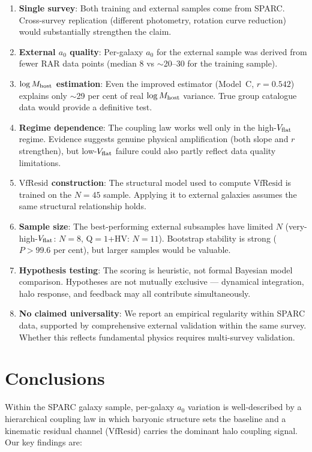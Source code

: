 \documentclass[fleqn,usenatbib]{mnras}
\newcommand{\azero}{a_0}
\newcommand{\vflat}{V_{\rm flat}}
\newcommand{\vfresid}{\mathrm{VfResid}}
\newcommand{\mhost}{M_{\rm host}}
\begin{document}
\begin{enumerate}
\item \textbf{Single survey}: Both training and external samples come from
  SPARC. Cross-survey replication (different photometry, rotation curve
  reduction) would substantially strengthen the claim.
\item \textbf{External $\azero$ quality}: Per-galaxy $\azero$ for the
  external sample was derived from fewer RAR data points (median 8 vs
  $\sim$20--30 for the training sample).
\item \textbf{$\log \mhost$ estimation}: Even the improved estimator
  (Model~C, $r = 0.542$) explains only $\sim$29 per cent of real
  $\log \mhost$ variance. True group catalogue data would provide a
  definitive test.
\item \textbf{Regime dependence}: The coupling law works well only in the
  high-$\vflat$ regime. Evidence suggests genuine physical amplification
  (both slope and $r$ strengthen), but low-$\vflat$ failure could also
  partly reflect data quality limitations.
\item \textbf{$\vfresid$ construction}: The structural model used to
  compute $\vfresid$ is trained on the $N = 45$ sample. Applying it to
  external galaxies assumes the same structural relationship holds.
\item \textbf{Sample size}: The best-performing external subsamples have
  limited $N$ (very-high-$\vflat$: $N = 8$, Q$=1$+HV: $N = 11$).
  Bootstrap stability is strong ($P > 99.6$ per cent), but larger samples
  would be valuable.
\item \textbf{Hypothesis testing}: The scoring is heuristic, not formal
  Bayesian model comparison. Hypotheses are not mutually exclusive ---
  dynamical integration, halo response, and feedback may all contribute
  simultaneously.
\item \textbf{No claimed universality}: We report an empirical regularity
  within SPARC data, supported by comprehensive external validation within
  the same survey. Whether this reflects fundamental physics requires
  multi-survey validation.
\end{enumerate}

\section{Conclusions}
\label{sec:conclusions}

Within the SPARC galaxy sample, per-galaxy $\azero$ variation is
well-described by a hierarchical coupling law in which baryonic structure
sets the baseline and a kinematic residual channel ($\vfresid$) carries
the dominant halo coupling signal. Our key findings are:
\end{document}
